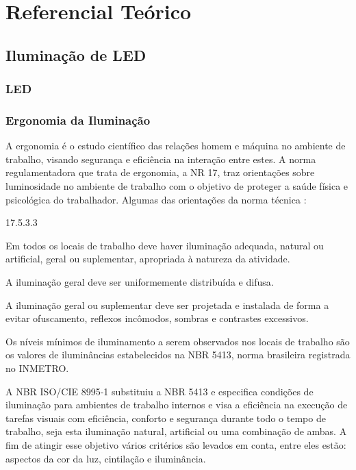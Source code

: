 \chapter{Referencial Teórico}
\section{Iluminação de LED}
\subsection{LED}

\subsection{Ergonomia da Iluminação}

A ergonomia é o estudo científico das relações homem e máquina no ambiente de trabalho, visando segurança e eficiência na interação entre estes. A norma regulamentadora que trata de ergonomia, a NR 17, traz orientações sobre luminosidade no ambiente de trabalho com o objetivo de proteger a saúde física e psicológica do trabalhador. Algumas das orientações da norma técnica \cite{nr}:

\begin{labeling}{17.5.3.3}
    \item[17.5.3] Em todos os locais de trabalho deve haver iluminação adequada, natural ou artificial, geral ou suplementar, apropriada à natureza da atividade.\\
    \item[17.5.3.1]  A iluminação geral deve ser uniformemente distribuída e difusa.\\
    \item[17.5.3.2] A iluminação geral ou suplementar deve ser projetada e instalada de forma a evitar ofuscamento, reflexos incômodos, sombras e contrastes excessivos.\\
    \item[17.5.3.3] Os níveis mínimos de iluminamento a serem observados nos locais de trabalho são os valores de iluminâncias estabelecidos na NBR 5413, norma brasileira registrada no INMETRO.
\end{labeling}

A NBR ISO/CIE 8995-1  substituiu a NBR 5413 e especifica condições de iluminação para ambientes de trabalho internos e visa a eficiência na execução de tarefas visuais com eficiência, conforto e segurança durante todo o tempo de trabalho, seja esta iluminação natural, artificial ou uma combinação de ambas. A fim de atingir esse objetivo vários critérios são levados em conta, entre eles estão: aspectos da cor da luz, cintilação e iluminância.

